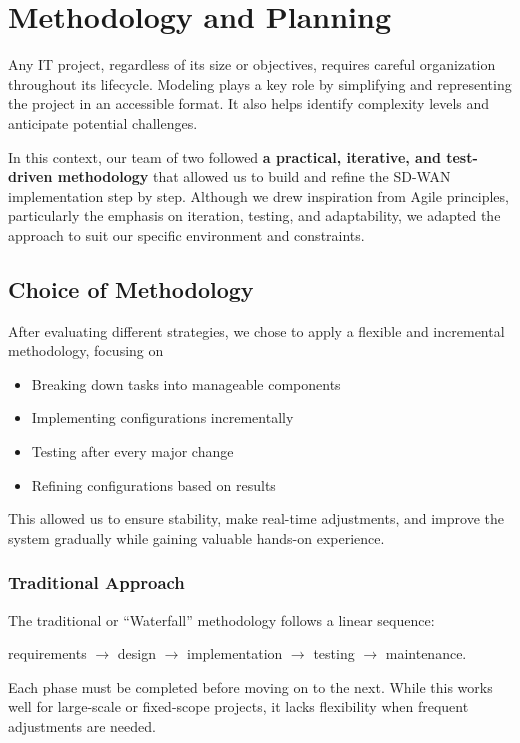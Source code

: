 \documentclass[12pt,english]{report}
\begin{document}
\section{Methodology and Planning}
\label{sec:methodology}

Any IT project, regardless of its size or objectives, requires careful organization throughout its lifecycle. Modeling plays a key role by simplifying and representing the project in an accessible format. It also helps identify complexity levels and anticipate potential challenges.

In this context, our team of two followed \textbf{a practical, iterative, and test-driven methodology} that allowed us to build and refine the SD-WAN implementation step by step. Although we drew inspiration from Agile principles, particularly the emphasis on iteration, testing, and adaptability, we adapted the approach to suit our specific environment and constraints.

\subsection{Choice of Methodology}

After evaluating different strategies, we chose to apply a flexible and incremental methodology, focusing on
\begin{itemize}
    \item Breaking down tasks into manageable components
    \item Implementing configurations incrementally
    \item Testing after every major change
    \item Refining configurations based on results
\end{itemize}
This allowed us to ensure stability, make real-time adjustments, and improve the system gradually while gaining valuable hands-on experience.
\subsubsection{Traditional Approach}

The traditional or ``Waterfall'' methodology follows a linear sequence:

requirements $\rightarrow$ design $\rightarrow$ implementation $\rightarrow$ testing $\rightarrow$ maintenance.

Each phase must be completed before moving on to the next. While this works well for large-scale or fixed-scope projects, it lacks flexibility when frequent adjustments are needed.
\end{document}

